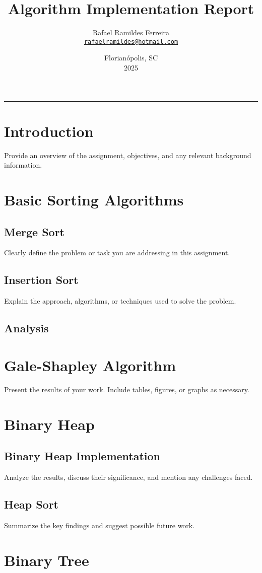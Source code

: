 \documentclass[a4paper,12pt]{article}
\title{Algorithm Implementation Report}
\author{Rafael Ramildes Ferreira \\ \href{mailto:rafaelramildes@hotmail.com}{\texttt{rafaelramildes@hotmail.com}}}
\date{Florianópolis, SC \\ 2025}
\begin{document}
\maketitle
\noindent\rule{\textwidth}{0.5pt}

\section*{Introduction}
Provide an overview of the assignment, objectives, and any relevant background information.

\section{Basic Sorting Algorithms}
\label{sec:sorting}
\subsection{Merge Sort}
Clearly define the problem or task you are addressing in this assignment.

\subsection{Insertion Sort}
Explain the approach, algorithms, or techniques used to solve the problem.

\subsection{Analysis}


\section{Gale-Shapley Algorithm}
\label{sec:gale-shapley}
Present the results of your work. Include tables, figures, or graphs as necessary.

\section{Binary Heap}
\label{sec:binary-heap}
\subsection{Binary Heap Implementation}
Analyze the results, discuss their significance, and mention any challenges faced.

\subsection{Heap Sort}
Summarize the key findings and suggest possible future work.


\section{Binary Tree}
\label{sec:binary-tree}
\end{document}
